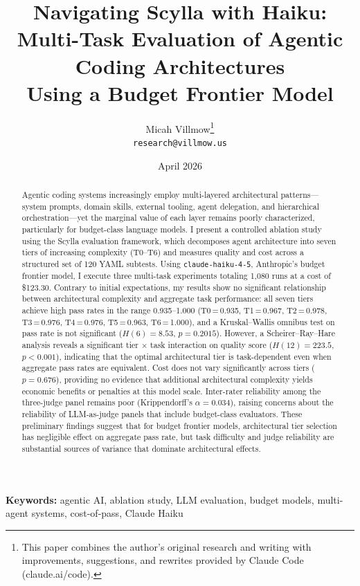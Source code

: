 \documentclass[11pt]{article}
\title{Navigating Scylla with Haiku:\\Multi-Task Evaluation of Agentic Coding Architectures\\Using a Budget Frontier Model}
\author{
  Micah Villmow\thanks{This paper combines the author's original research
  and writing with improvements, suggestions, and rewrites provided by
  Claude Code (claude.ai/code).} \\
  \texttt{research@villmow.us}
}
\date{April 2026}
\begin{document}
\maketitle

\begin{abstract}
Agentic coding systems increasingly employ multi-layered architectural
patterns---system prompts, domain skills, external tooling, agent delegation,
and hierarchical orchestration---yet the marginal value of each layer remains
poorly characterized, particularly for budget-class language models. I present
a controlled ablation study using the Scylla evaluation framework, which
decomposes agent architecture into seven tiers of increasing complexity
(T0--T6) and measures quality and cost across a structured set of 120 YAML
subtests. Using \texttt{claude-haiku-4-5}, Anthropic's budget frontier model,
I execute three multi-task experiments totaling 1,080 runs at a cost of
\$123.30. Contrary to initial expectations, my results show no significant
relationship between architectural complexity and aggregate task performance:
all seven tiers achieve high pass rates in the range 0.935--1.000
(T0\,=\,0.935, T1\,=\,0.967, T2\,=\,0.978, T3\,=\,0.976, T4\,=\,0.976,
T5\,=\,0.963, T6\,=\,1.000), and a Kruskal--Wallis omnibus test on pass rate
is not significant ($H(6)=8.53$, $p=0.2015$). However, a
Scheirer--Ray--Hare analysis reveals a significant tier $\times$ task
interaction on quality score ($H(12)=223.5$, $p<0.001$), indicating that the
optimal architectural tier is task-dependent even when aggregate pass rates are
equivalent. Cost does not vary significantly across tiers ($p=0.676$),
providing no evidence that additional architectural complexity yields economic
benefits or penalties at this model scale. Inter-rater reliability among the
three-judge panel remains poor (Krippendorff's $\alpha=0.034$), raising
concerns about the reliability of LLM-as-judge panels that include
budget-class evaluators. These preliminary findings suggest that for budget
frontier models, architectural tier selection has negligible effect on
aggregate pass rate, but task difficulty and judge reliability are substantial
sources of variance that dominate architectural effects.
\end{abstract}

\textbf{Keywords:} agentic AI, ablation study, LLM evaluation, budget models,
multi-agent systems, cost-of-pass, Claude Haiku
\end{document}
